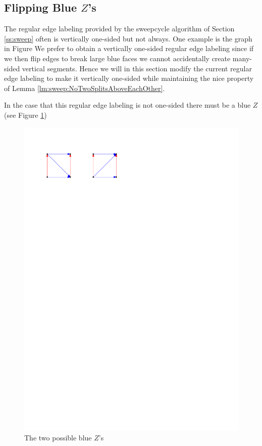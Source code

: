 
\subsection{Flipping Blue $Z$'s}
\thispagestyle{plain}
\label{ss:flipBlueZ}

  The regular edge labeling provided by the sweepcycle algorithm of Section \ref{ss:sweep} often is vertically one-sided but not always. One example is the graph in Figure 
  We prefer to obtain a vertically one-sided regular edge labeling since if we then flip edges to break large blue faces we cannot accidentally create many-sided vertical segments. Hence we will in this section modify the current regular edge labeling to make it vertically one-sided while maintaining the nice property of Lemma \ref{lm:sweep:NoTwoSplitsAboveEachOther}.


  In the case that this regular edge labeling is not one-sided there must be a blue $Z$ (see Figure \ref{fig:zflip:blueZ})

  \begin{figure}[h]
    \centering
    \includegraphics[scale=1]{unifiedAlgo/img/zflip/blueZ.pdf}
    \caption{The two possible blue $Z$'s}
    \label{fig:zflip:blueZ}
  \end{figure}

